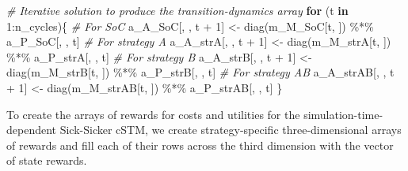 \documentclass[
]{article}
\newenvironment{Shaded}{\begin{snugshade}}{\end{snugshade}}
\newcommand{\CommentTok}[1]{\textcolor[rgb]{0.56,0.35,0.01}{\textit{#1}}}
\newcommand{\ControlFlowTok}[1]{\textcolor[rgb]{0.13,0.29,0.53}{\textbf{#1}}}
\newcommand{\DecValTok}[1]{\textcolor[rgb]{0.00,0.00,0.81}{#1}}
\newcommand{\FunctionTok}[1]{\textcolor[rgb]{0.00,0.00,0.00}{#1}}
\newcommand{\NormalTok}[1]{#1}
\newcommand{\OtherTok}[1]{\textcolor[rgb]{0.56,0.35,0.01}{#1}}
\newcommand{\SpecialCharTok}[1]{\textcolor[rgb]{0.00,0.00,0.00}{#1}}
\begin{document}
\begin{Shaded}
\begin{Highlighting}[]
\CommentTok{\# Iterative solution to produce the transition{-}dynamics array}
\ControlFlowTok{for}\NormalTok{ (t }\ControlFlowTok{in} \DecValTok{1}\SpecialCharTok{:}\NormalTok{n\_cycles)\{}
  \CommentTok{\# For SoC}
\NormalTok{  a\_A\_SoC[, , t }\SpecialCharTok{+} \DecValTok{1}\NormalTok{] }\OtherTok{\textless{}{-}} \FunctionTok{diag}\NormalTok{(m\_M\_SoC[t, ]) }\SpecialCharTok{\%*\%}\NormalTok{ a\_P\_SoC[, , t]}
  \CommentTok{\# For strategy A}
\NormalTok{  a\_A\_strA[, , t }\SpecialCharTok{+} \DecValTok{1}\NormalTok{] }\OtherTok{\textless{}{-}} \FunctionTok{diag}\NormalTok{(m\_M\_strA[t, ]) }\SpecialCharTok{\%*\%}\NormalTok{ a\_P\_strA[, , t]}
  \CommentTok{\# For strategy B}
\NormalTok{  a\_A\_strB[, , t }\SpecialCharTok{+} \DecValTok{1}\NormalTok{] }\OtherTok{\textless{}{-}} \FunctionTok{diag}\NormalTok{(m\_M\_strB[t, ]) }\SpecialCharTok{\%*\%}\NormalTok{ a\_P\_strB[, , t]}
  \CommentTok{\# For strategy AB}
\NormalTok{  a\_A\_strAB[, , t }\SpecialCharTok{+} \DecValTok{1}\NormalTok{] }\OtherTok{\textless{}{-}} \FunctionTok{diag}\NormalTok{(m\_M\_strAB[t, ]) }\SpecialCharTok{\%*\%}\NormalTok{ a\_P\_strAB[, , t]}
\NormalTok{\}}
\end{Highlighting}
\end{Shaded}

To create the arrays of rewards for costs and utilities for the simulation-time-dependent Sick-Sicker cSTM, we create strategy-specific three-dimensional arrays of rewards and fill each of their rows across the third dimension with the vector of state rewards.
\end{document}
